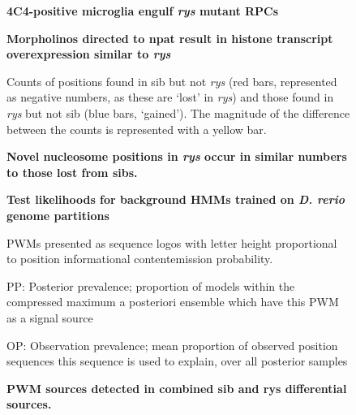 \begin{figure}[!h]
    \caption{{\bf 4C4-positive microglia engulf \textit{rys} mutant RPCs}} 
    \label{phagocytosis}
\end{figure}


\begin{figure}[!h]
    \caption{{\bf Morpholinos directed to npat result in histone transcript overexpression similar to \textit{rys}}} 
    \label{morpholinoRTPCR}
\end{figure}


\begin{figure}[!h]
    \caption{{\bf Novel nucleosome positions in \textit{rys} occur in similar numbers to those lost from sibs.}}
    Counts of positions found in sib but not \textit{rys} (red bars, represented as negative numbers, as these are `lost' in \textit{rys}) and those found in \textit{rys} but not sib (blue bars, `gained'). The magnitude of the difference between the counts is represented with a yellow bar.
    \label{diffposdist}
\end{figure}

\begin{figure}[!h]
    \caption{{\bf Test likelihoods for background HMMs trained on \textit{D. rerio} genome partitions}}
    \label{BHMMlh}
\end{figure}

\begin{figure}[!h]
    \caption{{\bf PWM sources detected in combined sib and rys differential sources.}}
    PWMs presented as sequence logos with letter height proportional to position informational content\/emission probability.
    
    PP: Posterior prevalence; proportion of models within the compressed maximum a posteriori ensemble which have this PWM as a signal source

    OP: Observation prevalence; mean proportion of observed position sequences this sequence is used to explain, over all posterior samples
    \label{combinedmotifs}
\end{figure}

